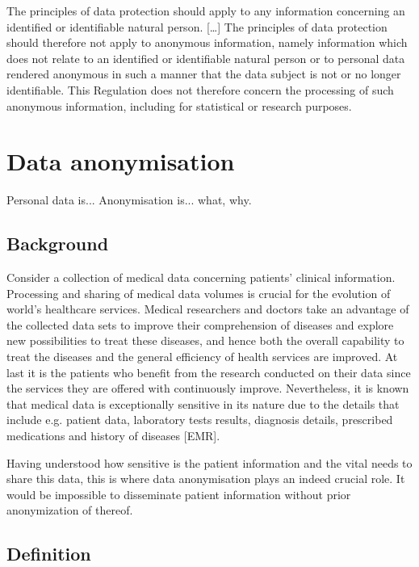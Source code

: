 \documentclass[a4paper,twoside,12pt]{book}
\begin{document}
\begin{displayquote}
	The principles of data protection should apply to any information concerning an identified or identifiable natural person. [\ldots] The principles of data protection should therefore not apply to anonymous information, namely information which does not relate to an identified or identifiable natural person or to personal data rendered anonymous in such a manner that the data subject is not or no longer identifiable. This Regulation does not therefore concern the processing of such anonymous information, including for statistical or research purposes.
\end{displayquote}


\section{Data anonymisation}

\color{blue}
Personal data is...
Anonymisation is... what, why.
\color{black}

\subsection{Background}
Consider a collection of medical data concerning patients' clinical information. Processing and sharing of medical data volumes is crucial for the evolution of world's healthcare services. Medical researchers and doctors take an advantage of the collected data sets to improve their comprehension of diseases and explore new possibilities to treat these diseases, and hence both the overall capability to treat the diseases and the general efficiency of health services are improved. At last it is the patients who benefit from the research conducted on their data since the services they are offered with continuously improve. Nevertheless, it is known that medical data is exceptionally sensitive in its nature due to the details that include e.g. patient data, laboratory tests results, diagnosis details, prescribed medications and history of diseases [EMR].

Having understood how sensitive is the patient information and the vital needs to share this data, this is where data anonymisation plays an indeed crucial role. It would be impossible to disseminate patient information without prior anonymization of thereof.

\subsection{Definition}
\end{document}
